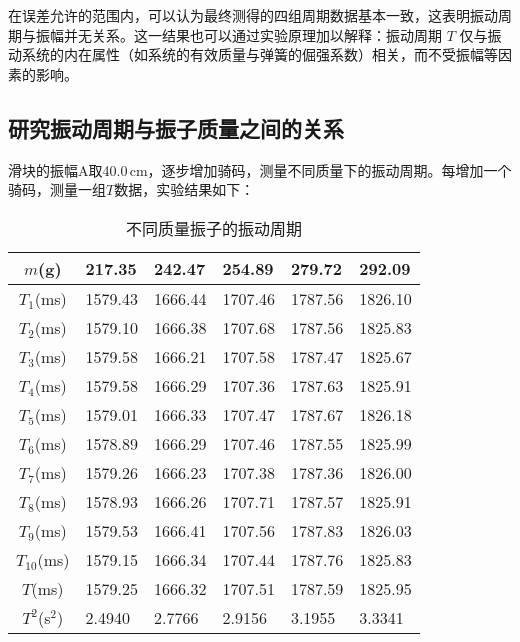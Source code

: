 \documentclass[UTF-8,twoside,cs4size]{ctexart}
\begin{document}
在误差允许的范围内，可以认为最终测得的四组周期数据基本一致，这表明振动周期与振幅并无关系。这一结果也可以通过实验原理加以解释：振动周期 $T$ 仅与振动系统的内在属性（如系统的有效质量与弹簧的倔强系数）相关，而不受振幅等因素的影响。

\subsection{研究振动周期与振子质量之间的关系}
滑块的振幅A取40.0\,cm，逐步增加骑码，测量不同质量下的振动周期。每增加一个骑码，测量一组$T$数据，实验结果如下：
\begin{table}[!h]
    \centering		
    \renewcommand\arraystretch{1.5}
    \begin{tabularx}{\textwidth}{|c|Y|Y|Y|Y|Y|}
        \hline
        $ m $\;(g)& 217.35 & 242.47 & 254.89 & 279.72 & 292.09 \\
        \hline
        $ T_1 $\;(ms)& 1579.43 & 1666.44 & 1707.46 & 1787.56 & 1826.10 \\
        \hline
        $ T_2 $\;(ms)& 1579.10 & 1666.38 & 1707.68 & 1787.56 & 1825.83 \\
        \hline
        $ T_3 $\;(ms)& 1579.58 & 1666.21 & 1707.58 & 1787.47 & 1825.67 \\
        \hline
        $ T_4 $\;(ms)& 1579.58 & 1666.29 & 1707.36 & 1787.63 & 1825.91 \\
        \hline
        $ T_5 $\;(ms)& 1579.01 & 1666.33 & 1707.47 & 1787.67 & 1826.18 \\
        \hline
        $ T_6 $\;(ms)& 1578.89 & 1666.29 & 1707.46 & 1787.55 & 1825.99 \\
        \hline
        $ T_7 $\;(ms)& 1579.26 & 1666.23 & 1707.38 & 1787.36 & 1826.00 \\
        \hline
        $ T_8 $\;(ms)& 1578.93 & 1666.26 & 1707.71 & 1787.57 & 1825.91 \\
        \hline
        $ T_9 $\;(ms)& 1579.53 & 1666.41 & 1707.56 & 1787.83 & 1826.03 \\
        \hline
        $ T_{10} $\;(ms)& 1579.15 & 1666.34 & 1707.44 & 1787.76 & 1825.83 \\
        \hline
        $ T $\;(ms)& 1579.25 & 1666.32 & 1707.51 & 1787.59 & 1825.95 \\
        \hline
        $ T^2 $\;(s$ ^2 $)& 2.4940 & 2.7766 & 2.9156 & 3.1955 & 3.3341 \\
        \hline
    \end{tabularx}
    \caption{不同质量振子的振动周期}
\end{table}
\end{document}
